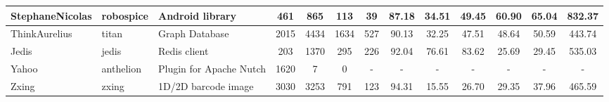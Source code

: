 \begin{table*}[]
{\begin{tabular}{lll|ccc|cccc|ccc}
StephaneNicolas             & robospice                                                     & Android library                                                          & 461            & 865             & 113                                                              & 39             & 87.18          & 34.51          & 49.45          & 60.90                                                             & 65.04                                                              & 832.37                                               \\ \hline
ThinkAurelius               & titan                                                         & Graph Database                                                           & 2015           & 4434            & 1634                                                             & 527            & 90.13          & 32.25          & 47.51          & 48.64                                                             & 50.59                                                              & 443.74                                               \\ \hline
Jedis                       & jedis                                                         & Redis client                                                             & 203            & 1370            & 295                                                              & 226            & 92.04          & 76.61          & 83.62          & 25.69                                                             & 29.45                                                              & 535.03                                               \\ \hline
Yahoo                       & anthelion                                                     & Plugin for Apache Nutch                                                  & 1620           & 7               & 0                                                                & -              & -              & -              & -              & -                                                                 & -                                                                  & -                                                    \\ \hline
Zxing                       & zxing                                                         & 1D/2D barcode image                                                      & 3030           & 3253            & 791                                                              & 123            & 94.31          & 15.55          & 26.70          & 29.35                                                             & 37.96                                                              & 465.59                                               \\ \hline

\end{tabular}}
\end{table*}
